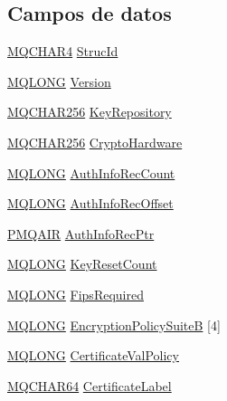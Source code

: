 \subsection*{Campos de datos}
\begin{DoxyCompactItemize}
\item 
\hyperlink{cmqc_8h_a12590e546ed66fda7cf21c1d5cefa31d}{M\+Q\+C\+H\+A\+R4} \hyperlink{structtag_m_q_s_c_o_a0530922ca944569b52601d74941f96e4}{Struc\+Id}
\item 
\hyperlink{cmqc_8h_a1fb8d28cbda3fa8766a9821230cdb6d5}{M\+Q\+L\+O\+N\+G} \hyperlink{structtag_m_q_s_c_o_a0656ef8f766b3907d394d88a35d7b7e9}{Version}
\item 
\hyperlink{cmqc_8h_ac492686cf8a90cc3dbc1c48143707ca7}{M\+Q\+C\+H\+A\+R256} \hyperlink{structtag_m_q_s_c_o_a7efe10d0683c0ef04c475b7f498861e7}{Key\+Repository}
\item 
\hyperlink{cmqc_8h_ac492686cf8a90cc3dbc1c48143707ca7}{M\+Q\+C\+H\+A\+R256} \hyperlink{structtag_m_q_s_c_o_ab60dc878f45a601e6affe294fb8449be}{Crypto\+Hardware}
\item 
\hyperlink{cmqc_8h_a1fb8d28cbda3fa8766a9821230cdb6d5}{M\+Q\+L\+O\+N\+G} \hyperlink{structtag_m_q_s_c_o_a080c9c24770964482da6331fa087f9a3}{Auth\+Info\+Rec\+Count}
\item 
\hyperlink{cmqc_8h_a1fb8d28cbda3fa8766a9821230cdb6d5}{M\+Q\+L\+O\+N\+G} \hyperlink{structtag_m_q_s_c_o_ae39127aab29444bb9cb49734645fbc10}{Auth\+Info\+Rec\+Offset}
\item 
\hyperlink{cmqc_8h_a23750cd3b09db5b72684c3c454ba812d}{P\+M\+Q\+A\+I\+R} \hyperlink{structtag_m_q_s_c_o_abb6923732084392b1be222ef7fc53847}{Auth\+Info\+Rec\+Ptr}
\item 
\hyperlink{cmqc_8h_a1fb8d28cbda3fa8766a9821230cdb6d5}{M\+Q\+L\+O\+N\+G} \hyperlink{structtag_m_q_s_c_o_a085f44eefd3c01bef61fabf7094d8d53}{Key\+Reset\+Count}
\item 
\hyperlink{cmqc_8h_a1fb8d28cbda3fa8766a9821230cdb6d5}{M\+Q\+L\+O\+N\+G} \hyperlink{structtag_m_q_s_c_o_af3cd714ea40e052132d11b981918d067}{Fips\+Required}
\item 
\hyperlink{cmqc_8h_a1fb8d28cbda3fa8766a9821230cdb6d5}{M\+Q\+L\+O\+N\+G} \hyperlink{structtag_m_q_s_c_o_a378a4654eeaf97c72604634c2d393cdc}{Encryption\+Policy\+Suite\+B} \mbox{[}4\mbox{]}
\item 
\hyperlink{cmqc_8h_a1fb8d28cbda3fa8766a9821230cdb6d5}{M\+Q\+L\+O\+N\+G} \hyperlink{structtag_m_q_s_c_o_a12dddc77a203a3cb57e519a8764f0920}{Certificate\+Val\+Policy}
\item 
\hyperlink{cmqc_8h_a7be9506b7b722fe66291e424a85afa4a}{M\+Q\+C\+H\+A\+R64} \hyperlink{structtag_m_q_s_c_o_a32c958352dbbcc6efc75fff3db4164b1}{Certificate\+Label}
\end{DoxyCompactItemize}


